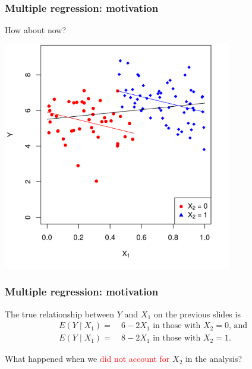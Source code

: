 \documentclass[12pt, 
hyperref={colorlinks=true, linkcolor=blue, urlcolor=cyan},dvipsnames]{beamer}
\begin{document}
\begin{frame}
\frametitle{Multiple regression: motivation}
How about now?

\vspace{-0.3cm}
\centering
\includegraphics[width = 0.75\textwidth]{./plots/confounding_colored_with_lines.png}
\end{frame}

\begin{frame}
\frametitle{Multiple regression: motivation}
The true relationship between $Y$ and $X_1$ on the previous slides is 
\begin{align*}
E(Y \mid X_1) =& \ 6 - 2 X_1 \text{ in those with $X_2 = 0$, and } \\
E(Y \mid X_1) =& \ 8 - 2 X_1 \text{ in those with $X_2 = 1$}.
\end{align*}

What happened when we \textcolor{red}{did not account for} $X_2$ in the analysis? 

\end{frame}
\end{document}

